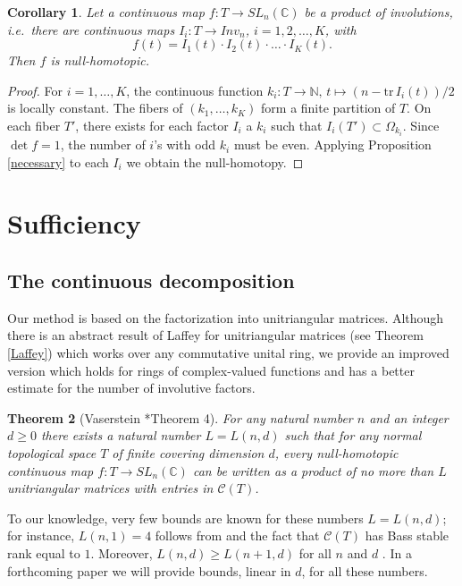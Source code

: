 \documentclass{amsart}
\newcommand{\C}{\mathbb{C}}
\newcommand{\N}{\mathbb N}
\newtheorem{Thm}{Theorem}[section]
\newtheorem{Cor}[Thm]{Corollary}
\theoremstyle{definition}
\begin{document}
 \begin{Cor} Let a continuous map $f: T \to SL_n(\C)$ be a product of involutions, i.e.\ there are continuous maps $I_i: T \to Inv_n$, $i=1,2, \ldots , K$, with $$f (t) = I_1(t) \cdot   I_2 (t) \cdot \ldots \cdot  I_K(t).$$ Then $f$ is null-homotopic.
\end{Cor} 
\begin{proof}
    For $i= 1, \dots, K$, the continuous function $k_i : T \to \N, \, t \mapsto (n- \mathrm{tr}\, I_i(t))/2$ is locally constant. The fibers of $(k_1, \dots, k_K)$ form a finite partition of $T$. On each fiber $T'$, there exists for each factor $I_i$ a $k_i$ such that $I_i(T') \subset \Omega_{k_i}$. Since $\det f = 1$, the number of $i$'s with odd $k_i$ must be even. Applying Proposition \ref{necessary} to each $I_i$  we obtain the null-homotopy. 
\end{proof}

\section{Sufficiency} 
\subsection{The continuous decomposition} \label{sufficient-cont}
Our method is based on the factorization into unitriangular matrices. Although there is an abstract result of Laffey for unitriangular matrices (see Theorem \ref{Laffey}) which works over any commutative unital ring, we provide an improved version which holds for rings of complex-valued functions and has a better estimate for the number of involutive factors.



\begin{Thm}[Vaserstein \cite{MR0947649}*{Theorem 4}] \label{vaserstein}
    For any natural number $n$ and an integer $d \ge 0$ there exists a natural
    number $L = L(n, d)$ such that for any normal topological space $T$ of finite covering dimension $d$, every null-homotopic continuous map $f : T \to SL_n(\C)$ can be written as a product of no more than $L$ unitriangular matrices with entries in $\mathcal{C}(T)$. 
\end{Thm}

To our knowledge, very few bounds are known for these numbers $L = L(n, d)$; for instance, $L(n,1)=4$ follows from \cite{MR2822515}
and the fact that $\mathcal{C}(T)$ has Bass stable rank equal to $1$. Moreover, $L(n, d)\ge L(n+1, d)$ for all $n$ and $d$ \cite{MR0961333}. In a forthcoming paper we will provide bounds, linear in $d$, for all these numbers.
\end{document}
